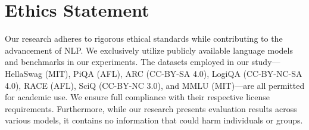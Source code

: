 \section*{Ethics Statement}

Our research adheres to rigorous ethical standards while contributing to the advancement of NLP. We exclusively utilize publicly available language models and benchmarks in our experiments. The datasets employed in our study—HellaSwag (MIT), PiQA (AFL), ARC (CC-BY-SA 4.0), LogiQA (CC-BY-NC-SA 4.0), RACE (AFL), SciQ (CC-BY-NC 3.0), and MMLU (MIT)—are all permitted for academic use. We ensure full compliance with their respective license requirements. Furthermore, while our research presents evaluation results across various models, it contains no information that could harm individuals or groups.